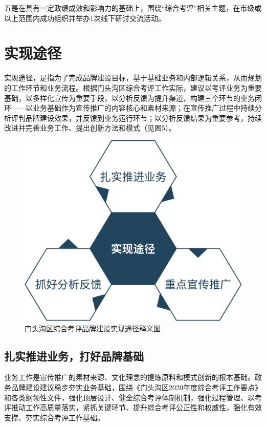 \documentclass[12pt]{article} %
\begin{document}
五是在具有一定政绩成效和影响力的基础上，围绕“综合考评”相关主题，在市级或以上范围内成功组织并举办1次线下研讨交流活动。

\section{实现途径}
实现途径，是指为了完成品牌建设目标，基于基础业务和内部逻辑关系，从而规划的工作环节和业务流程。根据门头沟区综合考评工作实际，建议以考评业务为重要基础，以多样化宣传为重要手段，以分析反馈为提升渠道，构建三个环节的业务闭环——以业务基础作为宣传推广的内容核心和素材来源；在宣传推广过程中持续分析评判品牌建设效果，并反馈到业务运行环节；以分析反馈结果为重要参考，持续改进并完善业务工作、提出创新方法和模式（见图5）。
\begin{figure}[ht]
\centering
\includegraphics[width=\textwidth]{figures/5.png}
\caption{门头沟区综合考评品牌建设实现途径释义图}
\label{fig:fig1}
\end{figure}

\subsection{扎实推进业务，打好品牌基础}
业务工作是宣传推广的素材来源、文化理念的提炼原料和模式创新的根本基础。政务品牌建设建议稳步夯实业务基础，围绕《门头沟区2020年度综合考评工作要点》和各类纲领性文件，强化顶层设计、健全综合考评体制机制，强化过程管理、以考评推动工作高质量落实，紧抓关键环节、提升综合考评公正性和权威性，强化有效支撑、夯实综合考评工作基础。
\end{document}
